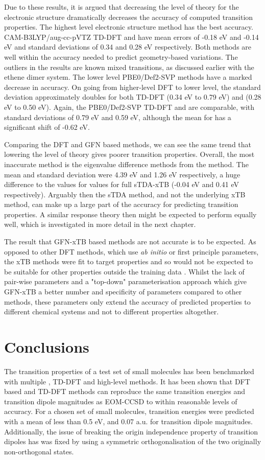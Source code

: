 Due to these results, it is argued that decreasing the level of theory for the electronic
structure dramatically decreases the accuracy of computed transition properties.
The highest level electronic structure method has the best accuracy. CAM-B3LYP/aug-cc-pVTZ 
TD-DFT and \dscf have mean errors of -0.18 eV and -0.14 eV and standard deviations 
of 0.34 and 0.28 eV respectively. Both methods are well within the accuracy needed 
to predict geometry-based variations. The outliers in the \dscf results are known
mixed transitions, as discussed earlier with the ethene dimer system. The lower 
level PBE0/Def2-SVP methods have a marked decrease in accuracy. On going from higher-level
DFT to lower level, the standard deviation approximately doubles for both TD-DFT 
(0.34 eV to 0.79 eV) and \dscf (0.28 eV to 0.50 eV). Again, the PBE0/Def2-SVP TD-DFT
and \dscf are comparable, with standard deviations of 0.79 eV and 0.59 eV, although
the mean for \dscf has a significant shift of -0.62 eV. 

Comparing the DFT and GFN based methods, we can see the same trend that lowering
the level of theory gives poorer transition properties. Overall, the most inaccurate
method is the eigenvalue difference methods from the  method. The
mean and standard deviation were 4.39 eV and 1.26 eV respectively, a huge difference 
to the values for values for full sTDA-xTB (-0.04 eV and 0.41 eV respectively)\cite{Grimme2016}. 
Arguably then the sTDA method, and not the underlying xTB method, can make up a 
large part of the accuracy for predicting transition properties. A similar response 
theory then might be expected to perform equally well, which is investigated in 
more detail in the next chapter.

The result that GFN-xTB based methods are not accurate is to be expected. As opposed
to other DFT methods, which use \emph{ab initio} or first principle parameters, the
xTB methods were fit to target properties and so would not be expected to be suitable
for other properties outside the training data \cite{Bannwarth2020}. Whilst the 
lack of pair-wise parameters and a "top-down" parameterisation approach which give
GFN-xTB a better number and specificity of parameters compared to other methods, 
these parameters only extend the accuracy of predicted properties to different
chemical systems and not to different properties altogether.

\section{Conclusions}
\label{sec:dxtb_conclusions}
The transition properties of a test set of small molecules has been benchmarked 
with multiple \dscf, TD-DFT and high-level methods. It has been shown that DFT 
based \dscf and TD-DFT methods can reproduce the same transition energies and 
transition dipole magnitudes as EOM-CCSD to within reasonable levels
of accuracy. For a chosen set of small molecules, transition energies were predicted
with a mean of less than 0.5 eV, and 0.07 a.u. for transition dipole magnitudes.
Additionally, the issue of breaking the origin independence property of transition
dipoles has was fixed by using a symmetric orthogonalisation of the two originally
non-orthogonal states.

